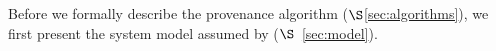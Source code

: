 


%
% 
%
%


%
%




Before we formally describe the provenance algorithm ($\S$\ref{sec:algorithms}),  we first present the system model assumed by \projecttitle ($\S$~\ref{sec:model}).
%














 